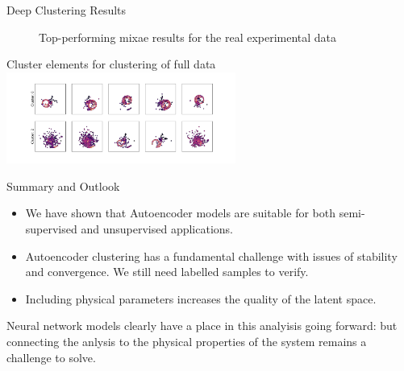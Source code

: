 \documentclass{beamer}
\begin{document}
\begin{frame}[t]{Deep Clustering Results}
	\centering 
	\begin{figure}[h]
		\caption{Top-performing mixae results for the real experimental data}
	\end{figure}
	Cluster elements for clustering of full data
	\includegraphics[height=3cm]{../chapters/results/clustering/plots/real_cluster_repr.pdf}
\end{frame}

\begin{frame}[t]{Summary and Outlook}
	\begin{itemize}
		\item We have shown that Autoencoder models are suitable for both semi-supervised and unsupervised applications.
		\item Autoencoder clustering has a fundamental challenge with issues of stability and convergence. We still need labelled samples to verify.
		\item Including physical parameters increases the quality of the latent space.
	\end{itemize}
	Neural network models clearly have a place in this analyisis going forward: but connecting the anlysis to the physical properties of the system remains a challenge to solve.
\end{frame}
\end{document}
